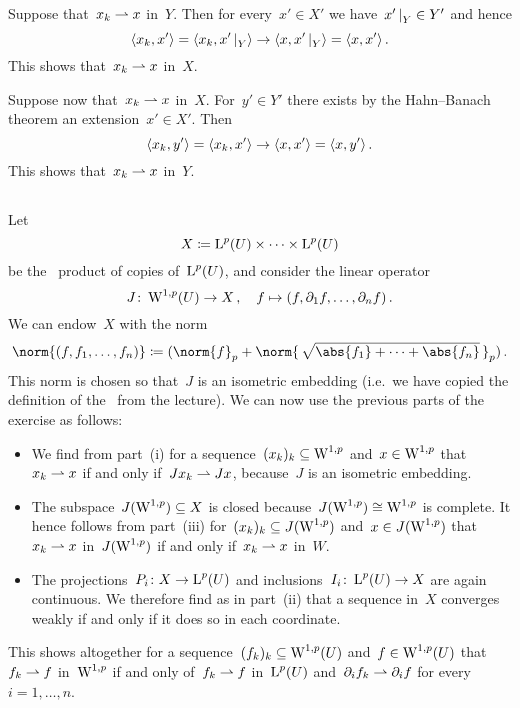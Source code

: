 \subsection{}

Suppose that~$x_k \rightharpoonup x$ in~$Y$.
Then for every~$x' \in X'$ we have~$\restrict{x'}{Y} \in Y'$ and hence
\[
      \bil{x_k, x'}
  =   \bil{x_k, \restrict{x'}{Y}}
  \to \bil{x, \restrict{x'}{Y}}
  =   \bil{x, x'} \,.
\]
This shows that~$x_k \rightharpoonup x$ in~$X$.

Suppose now that~$x_k \rightharpoonup x$ in~$X$.
For~$y' \in Y'$ there exists by the Hahn--Banach theorem an extension~$x' \in X'$.
Then
\[
      \langle x_k, y'\rangle
  =   \langle x_k, x'\rangle
  \to \langle x, x'\rangle
  =   \langle x, y'\rangle \,.
\]
This shows that~$x_k \rightharpoonup x$ in~$Y$.





\subsection{}

Let
\[
  X
  \coloneqq
  \operatorname{L}^p(U) \times \dotsb \times \operatorname{L}^p(U)
\]
be the~ product of copies of~$\operatorname{L}^p(U)$, and consider the linear operator
\[
          J
  \colon  \operatorname{W}^{1,p}(U)
  \to     X \,,
  \quad   f
  \mapsto (f, \partial_1 f, \dotsc, \partial_n f) \,.
\]
We can endow~$X$ with the norm
\[
  \norm{(f, f_1, \dotsc, f_n)}
  \defined
  ( \norm{f}_p + \norm{\,\sqrt{\abs{f_1} + \dotsb + \abs{f_n}}\,}_p ) \,.
\]
This norm is chosen so that~$J$ is an isometric embedding (i.e.\ we have copied the definition of the~ from the lecture).
We can now use the previous parts of the exercise as follows:
\begin{itemize}
  \item
    We find from part~(i) for a sequence~$(x_k)_k \subseteq \operatorname{W}^{1,p}$ and~$x \in \operatorname{W}^{1,p}$ that~$x_k \rightharpoonup x$ if and only if~$J x_k \rightharpoonup J x$, because~$J$ is an isometric embedding.
  \item
    The subspace~$J(\operatorname{W}^{1,p}) \subseteq X$ is closed because~$J(\operatorname{W}^{1,p}) \cong \operatorname{W}^{1,p}$ is complete.
    It hence follows from part~(iii) for~$(x_k)_k \subseteq J(\operatorname{W}^{1,p})$ and~$x \in J(\operatorname{W}^{1,p})$ that~$x_k \rightharpoonup x$ in~$J(\operatorname{W}^{1,p})$ if and only if~$x_k \rightharpoonup x$ in~$W$.
  \item
    The projections~$P_i \colon X \to \operatorname{L}^p(U)$ and inclusions~$I_i \colon \operatorname{L}^p(U) \to X$ are again continuous.
    We therefore find as in part~(ii) that a sequence in~$X$ converges weakly if and only if it does so in each coordinate.
\end{itemize}
This shows altogether for a sequence~$(f_k)_k \subseteq \operatorname{W}^{1,p}(U)$ and~$f \in \operatorname{W}^{1,p}(U)$ that~$f_k \rightharpoonup f$ in~$\operatorname{W}^{1,p}$ if and only of~$f_k \rightharpoonup f$ in~$\operatorname{L}^p(U)$ and~$\partial_i f_k \rightharpoonup \partial_i f$ for every~$i = 1, \dotsc, n$.











